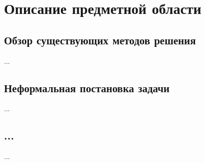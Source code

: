 \documentclass[../document.tex]{subfiles}
\begin{document}
	\section{Описание предметной области}
		\subsection{Обзор существующих методов решения}
			\par ...
		\subsection{Неформальная постановка задачи}
			\par ...
		\subsection{...}
			\par ...
\end{document}
